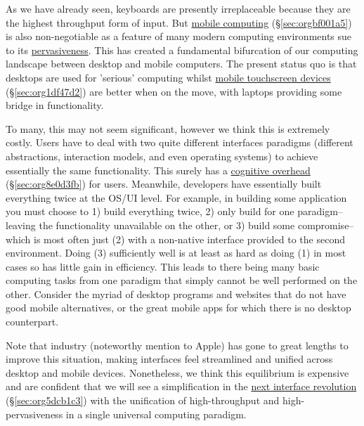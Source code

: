 \documentclass[logo,bsc,singlespacing,parskip]{infthesis}
\begin{document}
As we have already seen, keyboards are presently irreplaceable because they are the highest throughput form of input.
But \hyperref[sec:orgbf001a5]{mobile computing} (\S \ref{sec:orgbf001a5}) is also non-negotiable as a feature of many modern computing environments sue to its \hyperref[pervasiveness]{pervasiveness}.
This has created a fundamental bifurcation of our computing landscape between desktop and mobile computers.
The present status quo is that desktops are used for 'serious' computing whilst \hyperref[sec:org1df47d2]{mobile touchscreen devices} (\S \ref{sec:org1df47d2}) are better when on the move, with laptops providing some bridge in functionality.

To many, this may not seem significant, however we think this is extremely costly.
Users have to deal with two quite different interfaces paradigms (different abstractions, interaction models, and even operating systems) to achieve essentially the same functionality.
This surely has a \hyperref[sec:org8e0d3fb]{cognitive overhead} (\S \ref{sec:org8e0d3fb}) for users.
Meanwhile, developers have essentially built everything twice at the OS/UI level.
For example, in building some application you must choose to 1) build everything twice, 2) only build for one paradigm-- leaving the functionality unavailable on the other, or 3) build some compromise-- which is most often just (2) with a non-native interface provided to the second environment.
Doing (3) sufficiently well is at least as hard as doing (1) in most cases so has little gain in efficiency.
This leads to there being many basic computing tasks from one paradigm that simply cannot be well performed on the other.
Consider the myriad of desktop programs and websites that do not have good mobile alternatives, or the great mobile apps for which there is no desktop counterpart.

Note that industry (noteworthy mention to Apple) has gone to great lengths to improve this situation, making interfaces feel streamlined and unified across desktop and mobile devices.
Nonetheless, we think this equilibrium is expensive and are confident that we will see a simplification in the \hyperref[sec:org5dcb1c3]{next interface revolution} (\S \ref{sec:org5dcb1c3}) with the unification of high-throughput and high-pervasiveness in a single universal computing paradigm.
\end{document}
